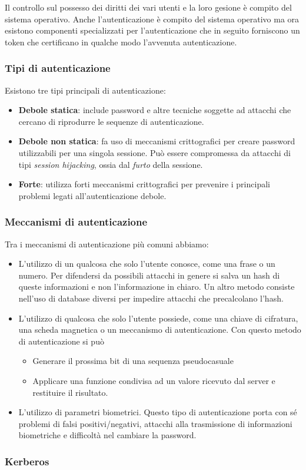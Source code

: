 Il controllo sul possesso dei diritti dei vari utenti e la loro gesione è compito del sistema operativo. Anche
l'autenticazione è compito del sistema operativo ma ora esistono componenti specializzati per l'autenticazione che in
seguito forniscono un token che certificano in qualche modo l'avvenuta autenticazione.

\subsubsection{Tipi di autenticazione}
Esistono tre tipi principali di autenticazione:
\begin{itemize}
	\item \textbf{Debole statica}: include password e altre tecniche soggette ad attacchi che cercano di riprodurre
	      le sequenze di autenticazione.
	\item \textbf{Debole non statica}: fa uso di meccanismi crittografici per creare password utilizzabili per una
	      singola sessione. Può essere compromessa da attacchi di tipi \emph{session hijacking}, ossia dal
	      \emph{furto} della sessione.
	\item \textbf{Forte}: utilizza forti meccanismi crittografici per prevenire i principali problemi legati
	      all'autenticazione debole.
\end{itemize}

\subsubsection{Meccanismi di autenticazione}
Tra i meccanismi di autenticazione più comuni abbiamo:
\begin{itemize}
	\item L'utilizzo di un qualcosa che solo l'utente conosce, come una frase o un numero. Per difendersi da possibili
	      attacchi in genere si salva un hash di queste informazioni e non l'informazione in chiaro. Un altro metodo
	      consiste nell'uso di database diversi per impedire attacchi che precalcolano l'hash.
	\item L'utilizzo di qualcosa che solo l'utente possiede, come una chiave di cifratura, una scheda magnetica o un
	      meccanismo di autenticazione. Con questo metodo di autenticazione si può
	      \begin{itemize}
		      \item Generare il prossima bit di una sequenza pseudocasuale
		      \item Applicare una funzione condivisa ad un valore ricevuto dal server e restituire il risultato.
	      \end{itemize}
	\item L'utilizzo di parametri biometrici. Questo tipo di autenticazione porta con sé problemi di falsi
	      positivi/negativi, attacchi alla trasmissione di informazioni biometriche e difficoltà nel cambiare la
	      password.
\end{itemize}

\subsubsection{Kerberos}